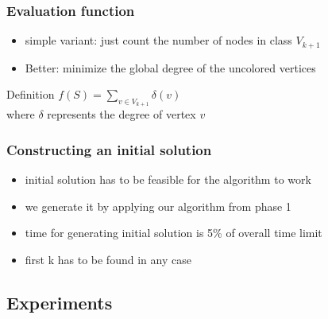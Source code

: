 \documentclass{beamer}
\begin{document}
\begin{frame}
    \frametitle{Evaluation function}

    \begin{itemize}
    \item simple variant: just count the number of nodes in class $V_{k+1}$
    \item Better: minimize the global degree of the uncolored vertices
    \end{itemize}

    \begin{block}{Definition}
      $f(S) = \sum\limits_{v \in V_{k+1}} \delta(v)$\\
      where $\delta$ represents the degree of vertex $v$

      \end{block}

  \end{frame}

\begin{frame}
  \frametitle{Constructing an initial solution}
  \begin{itemize}
  \item initial solution has to be feasible for the algorithm to work
  \item we generate it by applying our algorithm from phase 1
  \item time for generating initial solution is 5\% of overall time limit
  \item first k has to be found in any case
\end{itemize}
  \end{frame}

\subsection{Experiments}
\end{document}
